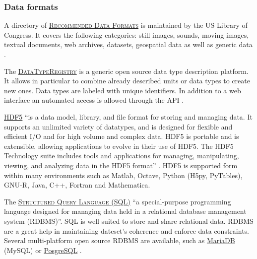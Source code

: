 \subsubsection{Data formats}

\noindent A directory of   \textsc{\href{http://www.digitalpreservation.gov/formats/}{Recommended Data Formats}} is maintained by the US Library of Congress. It covers the following categories: still images, sounds, moving images, textual documents, web archives, datasets, geospatial data as well as generic data \cite{libraryofcongress_sustainability_2015}.

\vspace{0.4cm}

\noindent The  \textsc{\href{http://www.typeregistry.org/registrar/}{DataTypeRegistry}} is a generic open source data type description platform. It allows in particular to combine already described units or data types to create new ones. Data types are labeled with unique identifiers. In addition to a web interface an automated access is allowed through the API \cite{datatyperegistry_data_2015}.

\vspace{0.4cm}

\noindent {}  \textsc{\href{https://www.hdfgroup.org/HDF5/}{HDF5}} ``is a data model, library, and file format for storing and managing data. It supports an unlimited variety of datatypes, and is designed for flexible and efficient I/O and for high volume and complex data. HDF5 is portable and is extensible, allowing applications to evolve in their use of HDF5. The HDF5 Technology suite includes tools and applications for managing, manipulating, viewing, and analyzing data in the HDF5 format'' \cite{hdf_group_hdf5_2015}. HDF5 is supported form within many environments such as Matlab, Octave, Python (H5py, PyTables), GNU-R, Java, C++, Fortran and Mathematica.

\vspace{0.4cm}

\noindent The  \textsc{\href{https://en.wikipedia.org/wiki/SQL}{Structured Query Language (SQL)}} ``a special-purpose programming language designed for managing data held in a relational database management system (RDBMS)''\cite{wikipedia_sql_2015}. SQL is well suited to store and share relational data. RDBMS are a great help in maintaining dateset's coherence and enforce data constraints. Several multi-platform open source RDBMS are available, such as \href{https://mariadb.org/}{MariaDB} (MySQL) \cite{mariadb_mariadb_2015} or \href{http://www.postgresql.org/}{PosgreSQL} \cite{postgresql_postgresql:_2015}.

